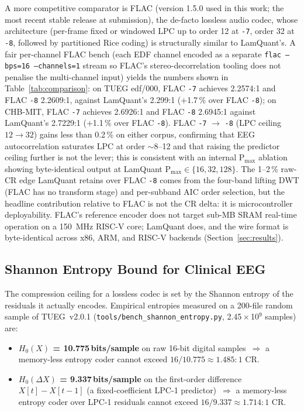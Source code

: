 \documentclass[journal]{IEEEtran}
\begin{document}
A more competitive comparator is FLAC (version 1.5.0 used in this
work; the most recent stable release at submission), the de-facto
lossless audio codec, whose architecture (per-frame fixed or
windowed LPC up to order 12 at \texttt{-7}, order 32 at
\texttt{-8}, followed by partitioned Rice coding) is structurally
similar to LamQuant's.
A fair per-channel FLAC bench (each EDF channel encoded as a
separate \texttt{flac --bps=16 --channels=1} stream so FLAC's
stereo-decorrelation tooling does not penalise the multi-channel
input) yields the numbers shown in Table~\ref{tab:comparison}: on
TUEG edf/000, FLAC \texttt{-7} achieves 2.2574:1 and FLAC
\texttt{-8} 2.2609:1, against LamQuant's 2.299:1 ($+$1.7\,\% over
FLAC \texttt{-8}); on CHB-MIT, FLAC \texttt{-7} achieves 2.6926:1
and FLAC \texttt{-8} 2.6945:1 against LamQuant's 2.7229:1
($+$1.1\,\% over FLAC \texttt{-8}). FLAC \texttt{-7} $\rightarrow$
\texttt{-8} (LPC ceiling $12 \rightarrow 32$) gains less than
0.2\,\% on either corpus, confirming that EEG autocorrelation
saturates LPC at order $\sim$8--12 and that raising the
predictor ceiling further is not the lever; this is consistent
with an internal P$_{\max}$ ablation showing byte-identical
output at LamQuant P$_{\max} \in \{16, 32, 128\}$. The
1--2\,\% raw-CR edge LamQuant retains over FLAC \texttt{-8}
comes from the four-band lifting DWT (FLAC has no transform stage)
and per-subband AIC order selection, but the headline contribution
relative to FLAC is not the CR delta: it is microcontroller
deployability. FLAC's reference encoder does not target sub-MB
SRAM real-time operation on a 150~MHz RISC-V core; LamQuant does,
and the wire format is byte-identical across x86, ARM, and RISC-V
backends (Section~\ref{sec:results}).

\subsection{Shannon Entropy Bound for Clinical EEG}
The compression ceiling for a lossless codec is set by the Shannon
entropy of the residuals it actually encodes. Empirical entropies
measured on a 200-file random sample of TUEG~v2.0.1
(\texttt{tools/bench\_shannon\_entropy.py}, 2.45\,$\times$\,10$^9$
samples) are:

\begin{itemize}
\item \textbf{$H_0(X)$ = 10.775\,bits/sample} on raw 16-bit
  digital samples~$\Rightarrow$ a memory-less entropy coder cannot
  exceed $16/10.775 \approx 1.485{:}1$ CR.
\item \textbf{$H_0(\Delta X)$ = 9.337\,bits/sample} on the
  first-order difference $X[t]-X[t-1]$ (a fixed-coefficient LPC-1
  predictor)~$\Rightarrow$ a memory-less entropy coder over LPC-1
  residuals cannot exceed $16/9.337 \approx 1.714{:}1$ CR.
\end{itemize}
\end{document}
